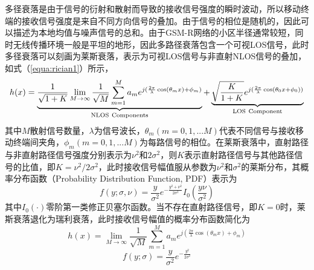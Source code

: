 多径衰落是由于信号的衍射和散射而导致的接收信号强度的瞬时波动，所以移动终端的接收信号强度是来自不同方向信号的叠加。由于信号的相位是随机的，因此可以描述为本地均值与噪声信号的总和。由于GSM-R网络的小区半径通常较短，同时无线传播环境一般是平坦的地形，因此多路径衰落包含一个可视LOS信号，此时多径衰落可以刻画为莱斯衰落，表示为可视LOS信号与非直射NLOS信号的叠加，如式（\ref{equa:rician1}）所示，
\begin{equation}
  h(x)=\underbrace{\frac{1}{\sqrt{1+K}}\lim_{M \to \infty}\frac{1}{\sqrt M}\sum_{m=1}^{M}a_{m}e^{j(\frac{2\pi}{\lambda}\cos(\theta_{m}x)+\phi_m)}}_{\rm NLOS~Components}
  +\underbrace{\sqrt{\frac{K}{1+K}}e^{j(\frac{2\pi}{\lambda}\cos(\theta_{0}x+ \phi_0))}}_{\rm LOS~Component}
\label{equa:rician1}
\end{equation}
其中$M$散射信号数量，$\lambda$为信号波长，$\theta_m(m=0,1,...M)$代表不同信号与接收移动终端间夹角，$\phi_m(m=0,1,...M)$为每路信号的相位。在莱斯衰落中，直射路径与非直射路径信号强度分别表示为$\nu^2$和$2\sigma^2$，则$K$表示直射路径信号与其他路径信号的比值，即$K=\nu^2/2\sigma^2$，此时接收信号幅值服从参数为$\nu^2$和$\sigma^2$的莱斯分布，其概率分布函数（Probability Distribution Function, PDF）表示为
\begin{equation}
    f(y;\sigma,\nu)=\frac{y}{\sigma^2}e^{-\frac{y^2+\nu^2}{2\sigma^2}}I_0\left(\frac{y\nu}{\sigma^2}\right)
\label{equa:ricianPDF}
\end{equation}
其中$I_0(\cdot)$零阶第一类修正贝塞尔函数。当不存在直射路径信号，即$K=0$时，莱斯衰落退化为瑞利衰落，此时接收信号幅值的概率分布函数简化为
\begin{equation}
    h(x)=\lim_{M \to \infty}\frac{1}{\sqrt M}\sum_{m=1}^{M}a_{m}e^{j\left(\frac{2\pi}{\lambda}\cos(\theta_{m}x)+\phi_m\right)}
\label{equa:rayleigh}
\end{equation}
\begin{equation}
    f(y;\sigma)=\frac{y}{\sigma^2}e^{-\frac{y^2}{2\sigma^2}}
\label{equa:rayleighPDF}
\end{equation}



